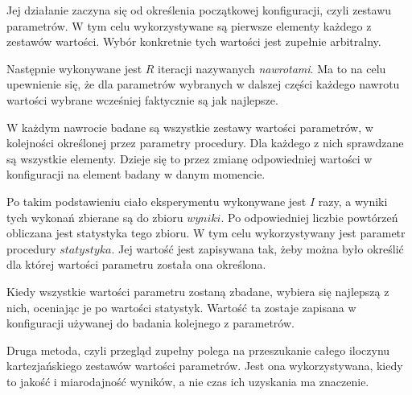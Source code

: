 \documentclass[./FM_mgr.tex]{subfiles}
\begin{document}
Jej działanie zaczyna się od określenia początkowej konfiguracji, czyli zestawu parametrów. 
W tym celu wykorzystywane są pierwsze elementy każdego z zestawów wartości.
Wybór konkretnie tych wartości jest zupełnie arbitralny.

Następnie wykonywane jest $R$ iteracji nazywanych \emph{nawrotami}.
Ma to na celu upewnienie się, że dla parametrów wybranych w dalszej części każdego nawrotu wartości wybrane wcześniej faktycznie są jak najlepsze.

W każdym nawrocie badane są wszystkie zestawy wartości parametrów, w kolejności określonej przez parametry procedury.
Dla każdego z nich sprawdzane są wszystkie elementy.
Dzieje się to przez zmianę odpowiedniej wartości w konfiguracji na element badany w danym momencie.

Po takim podstawieniu ciało eksperymentu wykonywane jest $I$ razy, a wyniki tych wykonań zbierane są do zbioru $wyniki$.
Po odpowiedniej liczbie powtórzeń obliczana jest statystyka tego zbioru.
W tym celu wykorzystywany jest parametr procedury $statystyka$.
Jej wartość jest zapisywana tak, żeby można było określić dla której wartości parametru została ona określona.

Kiedy wszystkie wartości parametru zostaną zbadane, wybiera się najlepszą z nich, oceniając je po wartości statystyk.
Wartość ta zostaje zapisana w konfiguracji używanej do badania kolejnego z parametrów.


Druga metoda, czyli przegląd zupełny polega na przeszukanie całego iloczynu kartezjańskiego zestawów wartości parametrów.
Jest ona wykorzystywana, kiedy to jakość i miarodajność wyników, a nie czas ich uzyskania ma znaczenie.
\end{document}
